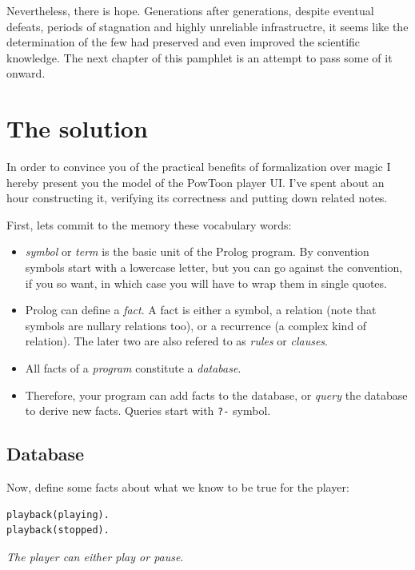 \documentclass[11pt]{article}
\begin{document}
Nevertheless, there is hope.  Generations after generations, despite eventual
defeats, periods of stagnation and highly unreliable infrastructre, it seems
like the determination of the few had preserved and even improved the
scientific knowledge.  The next chapter of this pamphlet is an attempt to
pass some of it onward.

\newpage
\section{The solution}
\label{sec-2}

In order to convince you of the practical benefits of formalization over magic
I hereby present you the model of the PowToon player UI.  I've spent about an
hour constructing it, verifying its correctness and putting down related
notes.

First, lets commit to the memory these vocabulary words:

\begin{itemize}
\item \emph{symbol} or \emph{term} is the basic unit of the Prolog program.  By convention
symbols start with a lowercase letter, but you can go against the
convention, if you so want, in which case you will have to wrap them in
single quotes.
\item Prolog can define a \emph{fact}.  A fact is either a symbol, a relation (note that
symbols are nullary relations too), or a recurrence (a complex kind of
relation).  The later two are also refered to as \emph{rules} or \emph{clauses}.
\item All facts of a \emph{program} constitute a \emph{database}.
\item Therefore, your program can add facts to the database, or \emph{query} the database
to derive new facts.  Queries start with \texttt{?-} symbol.
\end{itemize}

\subsection{Database}
\label{sec-2-1}

Now, define some facts about what we know to be true for the player:

\begin{verbatim}
playback(playing).
playback(stopped).
\end{verbatim}

\emph{The player can either play or pause}.
\end{document}
